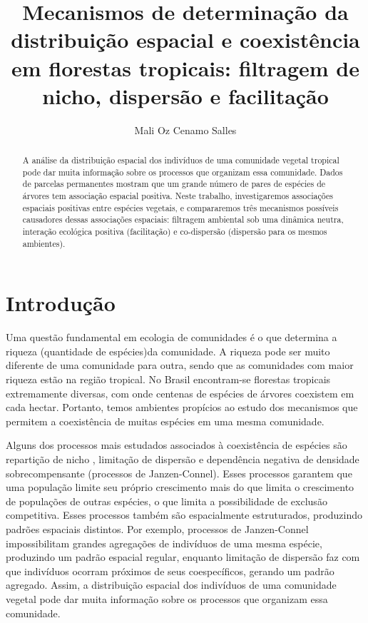 \documentclass[twoside,12pt,a4paper]{report}
\begin{document}
\title{Mecanismos de determinação da distribuição espacial e coexistência em florestas tropicais:
filtragem de nicho, dispersão e facilitação}
\author{Mali Oz Cenamo Salles}


\begin{abstract}

A análise da distribuição espacial dos indivíduos de uma comunidade vegetal tropical pode dar muita
informação sobre os processos que organizam essa comunidade. Dados de parcelas permanentes mostram
que um grande número de pares de espécies de árvores tem associação espacial positiva. Neste
trabalho, investigaremos associações espaciais positivas entre espécies vegetais, e compararemos
três mecanismos possíveis causadores dessas associações espaciais: filtragem ambiental sob uma
dinâmica neutra, interação ecológica positiva (facilitação) e co-dispersão (dispersão para os mesmos
ambientes).

\end{abstract}

\section{Introdução}

Uma questão fundamental em ecologia de comunidades é o que determina a riqueza (quantidade de
espécies)da comunidade. 
A riqueza pode ser muito diferente de uma comunidade para outra, sendo que as comunidades com
maior riqueza estão na região tropical.
No Brasil encontram-se florestas tropicais extremamente diversas, com onde centenas de
espécies de árvores coexistem em cada hectar. Portanto, temos ambientes propícios ao estudo dos mecanismos
que permitem a coexistência de muitas espécies em uma mesma comunidade.

Alguns dos processos mais estudados associados à coexistência de espécies são repartição de
nicho \citep{refs}, limitação de dispersão \citep{refs} e dependência negativa de densidade sobrecompensante
(processos de Janzen-Connel)\citep{refs}. 
Esses processos garantem que uma população limite seu próprio crescimento mais do que limita o
crescimento de populações de outras espécies, o que limita a possibilidade de exclusão
competitiva. 
Esses processos também são espacialmente
estruturados, produzindo padrões espaciais distintos. Por exemplo, processos de
Janzen-Connel impossibilitam grandes agregações de indivíduos de uma mesma espécie,
produzindo um padrão espacial regular, enquanto limitação de dispersão faz com que
indivíduos ocorram próximos de seus coespecíficos, gerando um padrão agregado.
Assim, a distribuição espacial dos indivíduos de uma comunidade vegetal pode dar muita
informação sobre os processos que organizam essa comunidade. 
\end{document}
